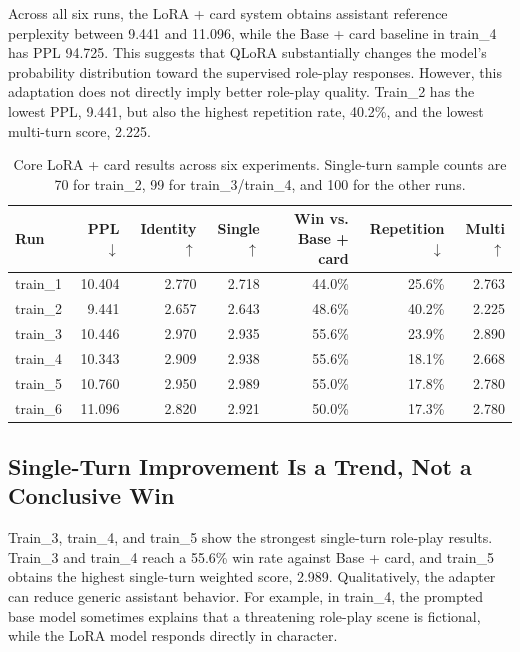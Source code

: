 \documentclass{article}
\newcommand{\card}{Base + card\xspace}
\newcommand{\lora}{LoRA + card\xspace}
\begin{document}
Across all six runs, the \lora system obtains assistant reference perplexity
between 9.441 and 11.096, while the \card baseline in train\_4 has PPL 94.725.
This suggests that QLoRA substantially changes the model's probability
distribution toward the supervised role-play responses. However, this
adaptation does not directly imply better role-play quality. Train\_2 has the
lowest PPL, 9.441, but also the highest repetition rate, 40.2\%, and the
lowest multi-turn score, 2.225.

\begin{table}[t]
  \centering
  \caption{Core \lora results across six experiments. Single-turn sample counts
  are 70 for train\_2, 99 for train\_3/train\_4, and 100 for the other runs.}
  \label{tab:lora-results}
  \small
  \begin{tabular}{lrrrrrr}
    \toprule
    Run & PPL $\downarrow$ & Identity $\uparrow$ & Single $\uparrow$ &
    Win vs. \card & Repetition $\downarrow$ & Multi $\uparrow$ \\
    \midrule
    train\_1 & 10.404 & 2.770 & 2.718 & 44.0\% & 25.6\% & 2.763 \\
    train\_2 & 9.441 & 2.657 & 2.643 & 48.6\% & 40.2\% & 2.225 \\
    train\_3 & 10.446 & 2.970 & 2.935 & 55.6\% & 23.9\% & 2.890 \\
    train\_4 & 10.343 & 2.909 & 2.938 & 55.6\% & 18.1\% & 2.668 \\
    train\_5 & 10.760 & 2.950 & 2.989 & 55.0\% & 17.8\% & 2.780 \\
    train\_6 & 11.096 & 2.820 & 2.921 & 50.0\% & 17.3\% & 2.780 \\
    \bottomrule
  \end{tabular}
\end{table}

\subsection{Single-Turn Improvement Is a Trend, Not a Conclusive Win}

Train\_3, train\_4, and train\_5 show the strongest single-turn role-play
results. Train\_3 and train\_4 reach a 55.6\% win rate against \card, and
train\_5 obtains the highest single-turn weighted score, 2.989. Qualitatively,
the adapter can reduce generic assistant behavior. For example, in train\_4,
the prompted base model sometimes explains that a threatening role-play scene
is fictional, while the LoRA model responds directly in character.
\end{document}
